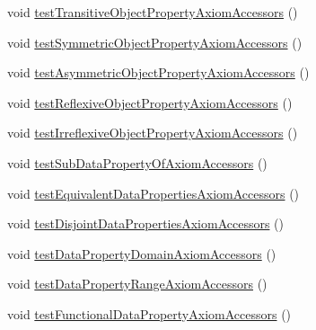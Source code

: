 \begin{DoxyCompactItemize}
\item 
void \hyperlink{classorg_1_1semanticweb_1_1owlapi_1_1api_1_1test_1_1ontology_1_1_o_w_l_ontology_accessors_test_case_a08fe79a0ee6f1a625a00707ab19b77a8}{test\-Transitive\-Object\-Property\-Axiom\-Accessors} ()
\item 
void \hyperlink{classorg_1_1semanticweb_1_1owlapi_1_1api_1_1test_1_1ontology_1_1_o_w_l_ontology_accessors_test_case_a6b80c00ea39eb9c2bc4bacad0ff65455}{test\-Symmetric\-Object\-Property\-Axiom\-Accessors} ()
\item 
void \hyperlink{classorg_1_1semanticweb_1_1owlapi_1_1api_1_1test_1_1ontology_1_1_o_w_l_ontology_accessors_test_case_a14b40ecc924e578ced1b96fd48ca7454}{test\-Asymmetric\-Object\-Property\-Axiom\-Accessors} ()
\item 
void \hyperlink{classorg_1_1semanticweb_1_1owlapi_1_1api_1_1test_1_1ontology_1_1_o_w_l_ontology_accessors_test_case_a32bdbfe3389dbb56629a72a85f0f78fe}{test\-Reflexive\-Object\-Property\-Axiom\-Accessors} ()
\item 
void \hyperlink{classorg_1_1semanticweb_1_1owlapi_1_1api_1_1test_1_1ontology_1_1_o_w_l_ontology_accessors_test_case_a1401d3d8e591d48bfbb6164a679f60e9}{test\-Irreflexive\-Object\-Property\-Axiom\-Accessors} ()
\item 
void \hyperlink{classorg_1_1semanticweb_1_1owlapi_1_1api_1_1test_1_1ontology_1_1_o_w_l_ontology_accessors_test_case_ad74dc8fdefd02e23e06a42e0ea2aa806}{test\-Sub\-Data\-Property\-Of\-Axiom\-Accessors} ()
\item 
void \hyperlink{classorg_1_1semanticweb_1_1owlapi_1_1api_1_1test_1_1ontology_1_1_o_w_l_ontology_accessors_test_case_abb2d406e109647713cafa49f2994d235}{test\-Equivalent\-Data\-Properties\-Axiom\-Accessors} ()
\item 
void \hyperlink{classorg_1_1semanticweb_1_1owlapi_1_1api_1_1test_1_1ontology_1_1_o_w_l_ontology_accessors_test_case_a7f0887955018110863e5afb0c76b98cf}{test\-Disjoint\-Data\-Properties\-Axiom\-Accessors} ()
\item 
void \hyperlink{classorg_1_1semanticweb_1_1owlapi_1_1api_1_1test_1_1ontology_1_1_o_w_l_ontology_accessors_test_case_a4050d3a3ed3e9a2a7523a8b5e6f1ef4c}{test\-Data\-Property\-Domain\-Axiom\-Accessors} ()
\item 
void \hyperlink{classorg_1_1semanticweb_1_1owlapi_1_1api_1_1test_1_1ontology_1_1_o_w_l_ontology_accessors_test_case_a8cd8af3e378e867b8dd320d0219fa6a4}{test\-Data\-Property\-Range\-Axiom\-Accessors} ()
\item 
void \hyperlink{classorg_1_1semanticweb_1_1owlapi_1_1api_1_1test_1_1ontology_1_1_o_w_l_ontology_accessors_test_case_a046ddb2279a2cae027cc7e3258c13b04}{test\-Functional\-Data\-Property\-Axiom\-Accessors} ()

\end{DoxyCompactItemize}
